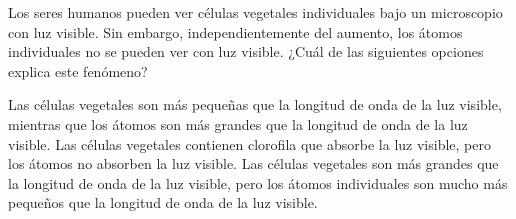 Los seres humanos pueden ver células vegetales individuales bajo un
microscopio con luz visible. Sin embargo, independientemente del aumento, los
átomos individuales no se pueden ver con luz visible.
¿Cuál de las siguientes opciones explica este fenómeno?

\begin{choices}
    \choice Las células vegetales son más pequeñas que la longitud de onda
    de la luz visible, mientras que los átomos son más grandes que la longitud de
    onda de la luz visible.
    \choice Las células vegetales contienen clorofila que absorbe la luz
    visible, pero los átomos no absorben la luz visible.
    \CorrectChoice Las células vegetales son más grandes que la longitud de onda
    de la luz visible, pero los átomos individuales son mucho más pequeños que la
    longitud de onda de la luz visible.
\end{choices}